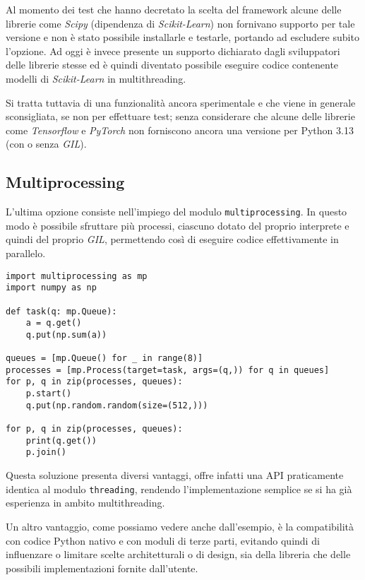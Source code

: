 Al momento dei test che hanno decretato la scelta del framework alcune delle
librerie come \textit{Scipy} (dipendenza di \textit{Scikit-Learn}) non
fornivano supporto per tale versione e non è stato possibile installarle e
testarle, portando ad escludere subito l'opzione. Ad oggi è invece presente un
supporto dichiarato dagli sviluppatori delle librerie stesse ed è quindi
diventato possibile eseguire codice contenente modelli di \textit{Scikit-Learn}
in multithreading.

Si tratta tuttavia di una funzionalità ancora sperimentale e che viene in
generale sconsigliata, se non per effettuare test; senza considerare che alcune
delle librerie come \textit{Tensorflow} e \textit{PyTorch} non forniscono ancora
una versione per Python 3.13 (con o senza \textit{GIL}).

\subsection{Multiprocessing}

L'ultima opzione consiste nell'impiego del modulo \verb|multiprocessing|. In
questo modo è possibile sfruttare più processi, ciascuno dotato del proprio
interprete e quindi del proprio \textit{GIL}, permettendo così di eseguire
codice effettivamente in parallelo.

\begin{lstlisting}[caption={Esempio multiprocessing}]
import multiprocessing as mp
import numpy as np

def task(q: mp.Queue):
	a = q.get()
	q.put(np.sum(a))

queues = [mp.Queue() for _ in range(8)]
processes = [mp.Process(target=task, args=(q,)) for q in queues]
for p, q in zip(processes, queues):
	p.start()
	q.put(np.random.random(size=(512,)))

for p, q in zip(processes, queues):
	print(q.get())
	p.join()
\end{lstlisting}

Questa soluzione presenta diversi vantaggi, offre infatti una API praticamente
identica al modulo \verb|threading|, rendendo l'implementazione semplice se si
ha già esperienza in ambito multithreading.

Un altro vantaggio, come possiamo vedere anche dall'esempio, è la compatibilità
con codice Python nativo e con moduli di terze parti, evitando quindi di
influenzare o limitare scelte architetturali o di design, sia della libreria che
delle possibili implementazioni fornite dall'utente.


